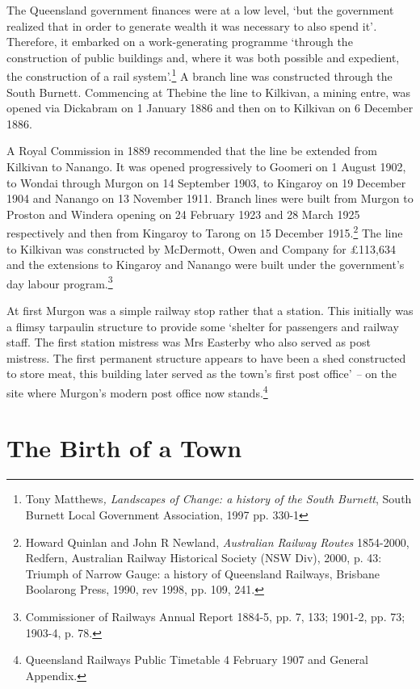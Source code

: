 The Queensland government finances were at a low level, `but the government realized that in order to generate wealth it was necessary to also spend it'\emph{.} Therefore, it embarked on a work-generating programme `through the construction of public buildings and, where it was both possible and expedient, the construction of a rail system'.\footnote{Tony Matthews\emph{, Landscapes of Change: a history of the South Burnett}, South Burnett Local Government Association, 1997 pp. 330-1} A branch line was constructed through the South Burnett. Commencing at Thebine the line to Kilkivan, a mining entre, was opened via Dickabram on 1 January 1886 and then on to Kilkivan on 6 December 1886.

A Royal Commission in 1889 recommended that the line be extended from Kilkivan to Nanango. It was opened progressively to Goomeri on 1 August 1902, to Wondai through Murgon on 14 September 1903, to Kingaroy on 19 December 1904 and Nanango on 13 November 1911. Branch lines were built from Murgon to Proston and Windera opening on 24 February 1923 and 28 March 1925 respectively and then from Kingaroy to Tarong on 15 December 1915.\footnote{Howard Quinlan and John R Newland, \emph{Australian Railway Routes} 1854-2000, Redfern, Australian Railway Historical Society (NSW Div), 2000, p. 43: Triumph of Narrow Gauge: a history of Queensland Railways, Brisbane Boolarong Press, 1990, rev 1998, pp. 109, 241.} The line to Kilkivan was constructed by McDermott, Owen and Company for £113,634 and the extensions to Kingaroy and Nanango were built under the government's day labour program.\footnote{Commissioner of Railways Annual Report 1884-5, pp. 7, 133; 1901-2, pp. 73; 1903-4, p. 78.}

At first Murgon was a simple railway stop rather that a station. This initially was a flimsy tarpaulin structure to provide some `shelter for passengers and railway staff. The first station mistress was Mrs Easterby who also served as post mistress. The first permanent structure appears to have been a shed constructed to store meat, this building later served as the town's first post office' \emph{--} on the site where Murgon's modern post office now stands.\footnote{Queensland Railways Public Timetable 4 February 1907 and General Appendix.}

\hypertarget{the-birth-of-a-town}{%
\chapter{The Birth of a Town}\label{the-birth-of-a-town}}

